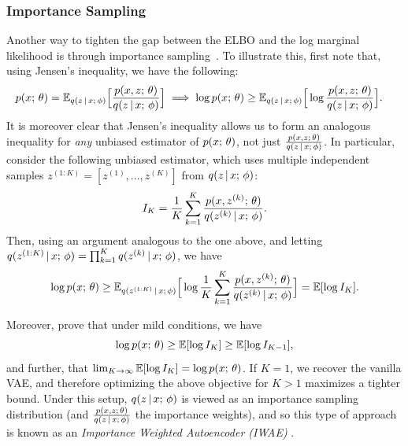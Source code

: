 \documentclass{article}
\begin{document}
\subsubsection{Importance Sampling}\label{importancesampling}
Another way to tighten the gap between the ELBO and the log marginal likelihood is through importance sampling~\citep{Burda2015}. %
To illustrate this, first note that, using Jensen's inequality, we have the following:
\begin{align*}
     p(x ; \, \theta) &= \mathbb{E}_{q(z \,|\, x ; \, \phi)} \Big[ \frac{p(x, z ; \, \theta)}{q(z \,|\, x ; \, \phi)}\Big] \implies 
     \log p(x ; \, \theta) \ge  \mathbb{E}_{q(z \,|\, x ; \, \phi)} \Big[\log  \frac{p(x, z ; \, \theta)}{q(z \,|\, x ; \, \phi)}\Big].
\end{align*}
It is moreover clear that Jensen's inequality allows us to form an analogous inequality for \textit{any} unbiased estimator of $p(x ; \, \theta)$, not just $\frac{p(x, z ; \, \theta)}{q(z \,|\, x ; \, \phi)}$. In particular, consider the following unbiased estimator, which uses multiple independent samples $z^{(1:K)} = [z^{(1)}, \dots, z^{(K)}]$ from $q(z \,|\, x ; \, \phi)$:
\[ I_K = \frac{1}{K} \sum_{k=1}^K \frac{p(x, z^{(k)} ; \, \theta)}{q(z^{(k)} \,|\, x ; \, \phi)}. \]
Then, using an argument analogous to the one above, and letting $q(z^{(1:K)} \,|\, x ; \, \phi) = \prod_{k=1}^K q(z^{(k)} \,|\, x ; \, \phi)$, we have
\[ 
     \log p(x ; \, \theta) \ge  \mathbb{E}_{q(z^{(1:K)} \,|\, x ; \, \phi)} 
     \Big[ \log \frac{1}{K} \sum_{k=1}^K \frac{p(x, z^{(k)} ; \, \theta)}{q(z^{(k)} \,|\, x ; \, \phi)} \Big] = \mathbb{E}[\log I_K].
     \]

Moreover, \citet{Burda2015} prove that under mild conditions, we have
\[ \log p(x ; \, \theta) \ge \mathbb{E}[\log I_K] \ge \mathbb{E}[\log I_{K-1}], \]
and further, that $\lim_{K \rightarrow \infty} \mathbb{E}[ \log I_K] = \log p(x ; \, \theta)$.
If $K=1$, we recover the vanilla VAE, and therefore optimizing the above
objective for $K>1$ maximizes a tighter bound.
Under this setup, $q(z \,|\, x ; \, \phi)$ is viewed as an importance sampling distribution (and $\frac{p(x, z ; \, \theta)}{q(z \,|\, x ; \, \phi)}$ the importance weights),
and so this type of approach is known as an \emph{Importance Weighted Autoencoder (IWAE)} \citep{Burda2015}.
\end{document}
